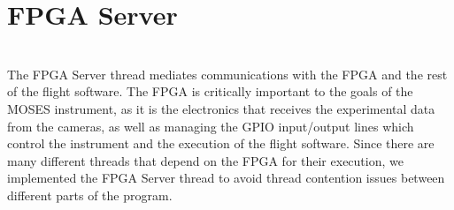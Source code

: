 %
\section{FPGA Server}
\hrulefill
\\
The FPGA Server thread mediates communications with the FPGA and the rest of the flight software. The FPGA is critically important to the goals of the MOSES instrument, as it is the electronics that receives the experimental data from the cameras, as well as managing the GPIO input/output lines which control the instrument and the execution of the flight software. Since there are many different threads that depend on the FPGA for their execution, we implemented the FPGA Server thread to avoid thread contention issues between different parts of the program.
